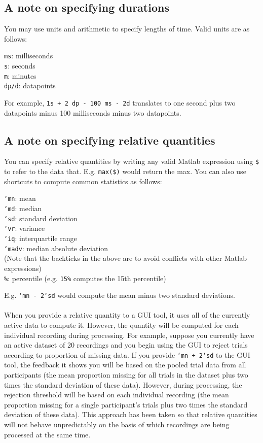 \documentclass{article}
\begin{document}
\subsection{A note on specifying durations} \label{timestr_explanation}
You may use units and arithmetic to specify lengths of time. Valid units are as follows:
\begin{addmargin}[1em]{0em}
\texttt{ms}: milliseconds\\
\texttt{s}: seconds\\
\texttt{m}: minutes\\
\texttt{dp/d}: datapoints
\end{addmargin}
For example, \texttt{1s + 2 dp - 100 ms - 2d} translates to one second plus two datapoints minus 100 milliseconds minus two datapoints.
\subsection{A note on specifying relative quantities} \label{datastr_explanation}
You can specify relative quantities by writing any valid Matlab expression using \texttt{\$} to refer to the data that. E.g. \texttt{max(\$)} would return the max. You can also use shortcuts to compute common statistics as follows:
\begin{addmargin}[1em]{0em}
\texttt{`mn}: mean\\
\texttt{`md}: median\\
\texttt{`sd}: standard deviation\\
\texttt{`vr}: variance\\
\texttt{`iq}: interquartile range\\
\texttt{`madv}: median absolute deviation\\
(Note that the backticks in the above are to avoid conflicts with other Matlab expressions)\\
\texttt{\%}: percentile (e.g. \texttt{15\%} computes the 15th percentile)
\end{addmargin}
E.g. \texttt{`mn - 2`sd} would compute the mean minus two standard deviations.\\\\
When you provide a relative quantity to a GUI tool, it uses all of the currently active data to compute it. However, the quantity will be computed for each individual recording during processing. For example, suppose you currently have an active dataset of 20 recordings and you begin using the GUI to reject trials according to proportion of missing data. If you provide \texttt{`mn + 2`sd} to the GUI tool, the feedback it shows you will be based on the pooled trial data from all participants (the mean proportion missing for all trials in the dataset plus two times the standard deviation of these data). However, during processing, the rejection threshold will be based on each individual recording (the mean proportion missing for a single participant's trials plus two times the standard deviation of these data). This approach has been taken so that relative quantities will not behave unpredictably on the basis of which recordings are being processed at the same time.
\end{document}
